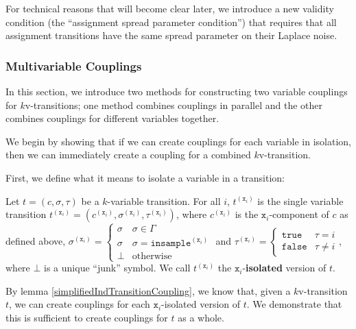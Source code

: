 For technical reasons that will become clear later, we introduce a new validity condition (the ``assignment spread parameter condition'') that requires that all assignment transitions have the same spread parameter on their Laplace noise.

\subsubsection{Multivariable Couplings}

In this section, we introduce two methods for constructing two variable couplings for $k$v-transitions; one method combines couplings in parallel and the other combines couplings for different variables together. 

We begin by showing that if we can create couplings for each variable in isolation, then we can immediately create a coupling for a combined $k$v-transition. 

First, we define what it means to isolate a variable in a transition: 

\begin{defn}
    Let $t = (c, \sigma, \tau)$ be a $k$-variable transition. For all $i$, $t^{(\texttt{x}_i)}$ is the single variable transition $t^{(\texttt{x}_i)} = (c^{(\texttt{x}_i)}, \sigma^{(\texttt{x}_i)}, \tau^{(\texttt{x}_i)})$, where $c^{(\texttt{x}_i)}$ is the $\texttt{x}_i$-component of $c$ as defined above, $\sigma^{(\texttt{x}_i)} = \begin{cases}
        \sigma & \sigma \in \Gamma\\
        \sigma & \sigma = \texttt{insample}^{(\texttt{x}_i)}\\
        \bot & \text{otherwise}
    \end{cases}$ and $\tau^{(\texttt{x}_i)} = \begin{cases}
        \texttt{true} & \tau = i\\
        \texttt{false} & \tau \neq i
    \end{cases}$, where $\bot$ is a unique ``junk'' symbol. We call $t^{(\texttt{x}_i)}$ the $\texttt{x}_i$-\textbf{isolated} version of $t$. 
\end{defn}

By lemma \ref{simplifiedIndTransitionCoupling}, we know that, given a $k$v-transition $t$, we can create couplings for each $\texttt{x}_i$-isolated version of $t$. We demonstrate that this is sufficient to create couplings for $t$ as a whole. 

